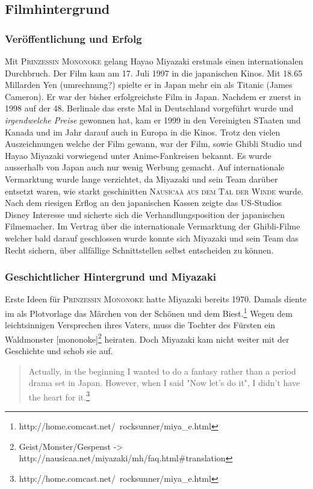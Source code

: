 \subsection{Filmhintergrund}
\subsubsection*{Veröffentlichung und Erfolg}
Mit \textsc{Prinzessin Mononoke} gelang Hayao Miyazaki erstmals einen internationalen Durchbruch. Der Film kam am 17. Juli 1997 in die japanischen Kinos. Mit 18.65 Millarden Yen (umrechnung?) spielte er in Japan mehr ein als Titanic (James Cameron). Er war der bisher erfolgreichste Film in Japan. Nachdem er zuerst in 1998 auf der 48. Berlinale das erste Mal in Deutschland vorgeführt wurde und \emph{irgendwelche Preise} gewonnen hat, kam er 1999 in den Vereinigten STaaten und Kanada und im Jahr darauf auch in Europa in die Kinos. Trotz den vielen Auszeichnungen welche der Film gewann, war der Film, sowie Ghibli Studio und Hayao Miyazaki vorwiegend unter Anime-Fankreisen bekannt. Es wurde ausserhalb von Japan auch nur wenig Werbung gemacht. Auf internationale Vermarktung wurde lange verzichtet, da Miyazaki und sein Team darüber entsetzt waren, wie starkt geschinitten \textsc{Nausicaä aus dem Tal der Winde} wurde. Nach dem riesigen Erflog an den japanischen Kassen zeigte das US-Studios Disney Interesse und sicherte sich die Verhandlungsposition der japanischen Filmemacher. Im Vertrag über die internationale Vermarktung der Ghibli-Filme welcher bald darauf geschlossen wurde konnte sich Miyazaki und sein Team das Recht sichern, über allfällige Schnittstellen selbst entscheiden zu können. 

\subsubsection*{Geschichtlicher Hintergrund und Miyazaki}
Erste Ideen für \textsc{Prinzessin Mononoke} hatte Miyazaki bereits 1970. Damals diente im als Plotvorlage das Märchen von der Schönen und dem Biest.\footnote{http://home.comcast.net/~rocksunner/miya\_e.html} Wegen dem leichtsinnigen Versprechen ihres Vaters, muss die Tochter des Fürsten ein Waldmonster [mononoke]\footnote{Geist/Monster/Gespenst -> http://nausicaa.net/miyazaki/mh/faq.html\#translation} heiraten. Doch Miyazaki kam nicht weiter mit der Geschichte und schob sie auf. 

\begin{quote} Actually, in the beginning I wanted to do a fantasy rather than a period drama set in Japan. However, when I said "Now let's do it", I didn't have the heart for it.\footnote{http://home.comcast.net/~rocksunner/miya\_e.html} 
\end{quote}

